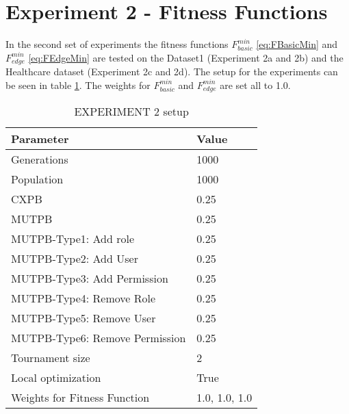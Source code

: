 \section{Experiment 2 - Fitness Functions}
\label{sec:exp2}
In the second set of experiments the fitness functions $F_{basic}^{min}$ \eqref{eq:FBasicMin} and $F_{edge}^{min}$ \eqref{eq:FEdgeMin} are tested on the Dataset1 (Experiment 2a and 2b) and the Healthcare dataset (Experiment 2c and 2d). The setup for the experiments can be seen in table \ref{tab:exp2_setup}. The weights for $F_{basic}^{min}$ and $F_{edge}^{min}$ are set all to 1.0.

\begin{table}[H]
    \centering
    \begin{adjustbox}{width=0.5\textwidth}
	    \begin{tabular}{|l|l|}
	        \hline
	        \rowcolor{myGray} 
	        \textbf{Parameter}              & \textbf{Value}    \\ \hline
	        Generations                     & 1000              \\ \hline
	        Population                      & 1000              \\ \hline
	        CXPB                            & 0.25              \\ \hline
	        MUTPB                           & 0.25              \\ \hline
	        MUTPB-Type1: Add role           & 0.25              \\ \hline
	        MUTPB-Type2: Add User           & 0.25              \\ \hline
	        MUTPB-Type3: Add Permission     & 0.25              \\ \hline
	        MUTPB-Type4: Remove Role        & 0.25              \\ \hline
	        MUTPB-Type5: Remove User        & 0.25              \\ \hline
	        MUTPB-Type6: Remove Permission  & 0.25              \\ \hline
	        Tournament size                 & 2                 \\ \hline
	        Local optimization              & True              \\ \hline
	        Weights for Fitness Function    & 1.0, 1.0, 1.0     \\ \hline
	    \end{tabular}
	\end{adjustbox}
    \caption{EXPERIMENT 2 setup}
    \label{tab:exp2_setup}
\end{table}

